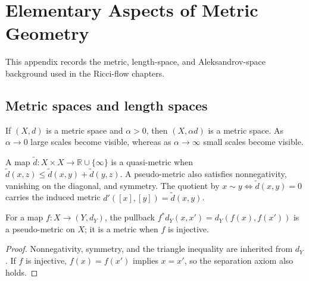 \chapter{Elementary Aspects of Metric Geometry}
\label{app:chow-iii-elementary-metric-geometry}

\newcommand{\GH}{d_{\mathrm{GH}}}
\newcommand{\GHpt}{d^{\mathrm{pt}}_{\mathrm{GH}}}
\newcommand{\diam}{\operatorname{diam}}
\newcommand{\Cone}{\operatorname{Cone}}
\newcommand{\cL}{\mathcal L}
\newcommand{\cA}{\mathcal A}
\newcommand{\R}{\mathbb R}
\newcommand{\dH}{d_{\mathrm H}}
\newcommand{\dimH}{\operatorname{dim}_{\mathrm H}}

This appendix records the metric, length-space, and Aleksandrov-space
background used in the Ricci-flow chapters.

\section{Metric spaces and length spaces}

\begin{remark}
\label{rem:chow-iii-g1-scaling-metric-spaces}
If $(X,d)$ is a metric space and $\alpha>0$, then $(X,\alpha d)$ is a metric
space.  As $\alpha\to0$ large scales become visible, whereas as
$\alpha\to\infty$ small scales become visible.
\end{remark}

\begin{remark}
\label{rem:chow-iii-g2-quasi-metric}
A map $\widetilde d:X\times X\to\R\cup\{\infty\}$ is a quasi-metric when
$\widetilde d(x,z)\leq\widetilde d(x,y)+\widetilde d(y,z)$.  A pseudo-metric
also satisfies nonnegativity, vanishing on the diagonal, and symmetry.  The
quotient by $x\sim y\iff\widetilde d(x,y)=0$ carries the induced metric
$d'([x],[y])=\widetilde d(x,y)$.
\end{remark}

\begin{proposition}
\label{prop:chow-iii-g3-pullback-metric}
For a map $f:X\to(Y,d_Y)$, the pullback $f^*d_Y(x,x')=d_Y(f(x),f(x'))$
is a pseudo-metric on $X$; it is a metric when $f$ is injective.
\end{proposition}
\begin{proof}
Nonnegativity, symmetry, and the triangle inequality are inherited from
$d_Y$.  If $f$ is injective, $f(x)=f(x')$ implies $x=x'$, so the separation
axiom also holds.
\end{proof}

